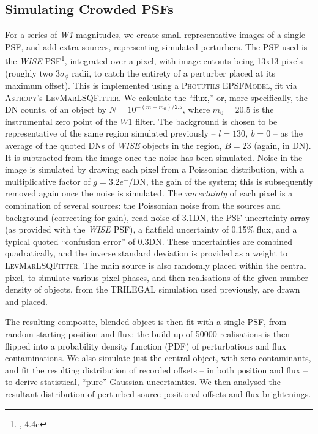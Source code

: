 \documentclass[fleqn,usenatbib]{mnras}
\begin{document}
\subsection{Simulating Crowded PSFs}
For a series of \textit{W1} magnitudes, we create small representative images of a single PSF, and add extra sources, representing simulated perturbers.
The PSF used is the \textit{WISE} PSF\footnote{\href{http://wise2.ipac.caltech.edu/docs/release/allsky/expsup/data/psf/pass2\_w1\_psf.tar.gz}{\citet{Cutri:2012aa}, 4.4c}}, integrated over a pixel, with image cutouts being 13x13 pixels (roughly two 3$\sigma_\phi$ radii, to catch the entirety of a perturber placed at its maximum offset).
This is implemented using a \textsc{Photutils} \textsc{EPSFModel}, fit via \textsc{Astropy}'s \textsc{LevMarLSQFitter}.
We calculate the ``flux,'' or, more specifically, the DN counts, of an object by $N = 10^{-(m - m_0)/2.5}$, where $m_0 = 20.5$ is the instrumental zero point of the $W1$ filter.
The background is chosen to be representative of the same region simulated previously -- $l = 130,\ b = 0$ -- as the average of the quoted DNs of \textit{WISE} objects in the region, $B = 23$ (again, in DN).
It is subtracted from the image once the noise has been simulated.
Noise in the image is simulated by drawing each pixel from a Poissonian distribution, with a multiplicative factor of $g = 3.2 e^-/\mathrm{DN}$, the gain of the system; this is subsequently removed again once the noise is simulated.
The \textit{uncertainty} of each pixel is a combination of several sources: the Poissonian noise from the sources and background (correcting for gain), read noise of $3.1$DN, the PSF uncertainty array (as provided with the \textit{WISE} PSF), a flatfield uncertainty of 0.15\% flux, and a typical quoted ``confusion error'' of 0.3DN.
These uncertainties are combined quadratically, and the inverse standard deviation is provided as a weight to \textsc{LevMarLSQFitter}.
The main source is also randomly placed within the central pixel, to simulate various pixel phases, and then realisations of the given number density of objects, from the TRILEGAL simulation used previously, are drawn and placed.

The resulting composite, blended object is then fit with a single PSF, from random starting position and flux; the build up of 50000 realisations is then flipped into a probability density function (PDF) of perturbations and flux contaminations.
We also simulate just the central object, with zero contaminants, and fit the resulting distribution of recorded offsets -- in both position and flux -- to derive statistical, ``pure'' Gaussian uncertainties.
We then analysed the resultant distribution of perturbed source positional offsets and flux brightenings.
\end{document}
